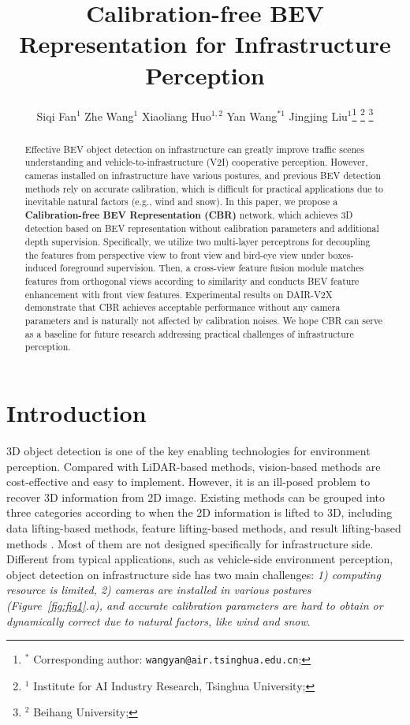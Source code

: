 \documentclass[letterpaper, 10 pt, conference]{ieeeconf}
\title{\LARGE \bf
Calibration-free BEV Representation for Infrastructure Perception
}
\author{Siqi Fan$^{1}$  Zhe Wang$^{1}$  Xiaoliang Huo$^{1,2}$  Yan Wang$^{*1}$ Jingjing Liu$^{1}$\thanks{$^{*}$ Corresponding author: {\tt\small wangyan@air.tsinghua.edu.cn};}
\thanks{$^{1}$ Institute for AI Industry Research, Tsinghua University;}
\thanks{$^{2}$ Beihang University;}
}
\begin{document}
\maketitle
\thispagestyle{empty}
\pagestyle{empty}


\begin{abstract}

Effective BEV object detection on infrastructure can greatly improve traffic scenes understanding and vehicle-to-infrastructure (V2I) cooperative perception. However, cameras installed on infrastructure have various postures, and previous BEV detection methods rely on accurate calibration, which is difficult for practical applications due to inevitable natural factors (e.g., wind and snow). In this paper, we propose a \textbf{Calibration-free BEV Representation (CBR)} network, which achieves 3D detection based on BEV representation without calibration parameters and additional depth supervision. Specifically, we utilize two multi-layer perceptrons for decoupling the features from perspective view to front view and bird-eye view under boxes-induced foreground supervision. Then, a cross-view feature fusion module matches features from orthogonal views according to similarity and conducts BEV feature enhancement with front view features. Experimental results on DAIR-V2X demonstrate that CBR achieves acceptable performance without any camera parameters and is naturally not affected by calibration noises. We hope CBR can serve as a baseline for future research addressing practical challenges of infrastructure perception.

\end{abstract}


\section{Introduction}
\label{sec:intro}

3D object detection is one of the key enabling technologies for environment perception. Compared with LiDAR-based methods, vision-based methods are cost-effective and easy to implement. However, it is an ill-posed problem to recover 3D information from 2D image.  Existing methods can be grouped into three categories according to when the 2D information is lifted to 3D, including data lifting-based methods, feature lifting-based methods, and result lifting-based methods \cite{ma20223d}. Most of them are not designed specifically for infrastructure side. Different from typical applications, such as vehicle-side environment perception, object detection on infrastructure side has two main challenges: \textit{1) computing resource is limited, 2) cameras are installed in various postures (Figure~\ref{fig:fig1}.a), and accurate calibration parameters are hard to obtain or dynamically correct due to natural factors, like wind and snow}.
\end{document}
